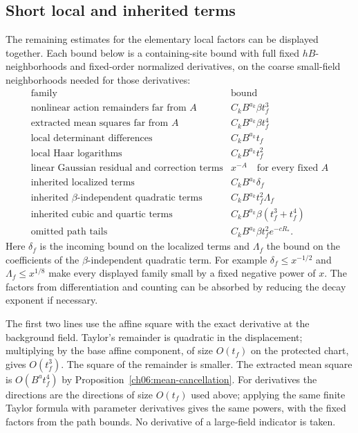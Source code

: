 \subsection{Short local and inherited terms}

The remaining estimates for the elementary local factors can be displayed together. Each bound
below is a containing-site bound with full fixed $hB$-neighborhoods and fixed-order
normalized derivatives, on the coarse small-field neighborhoods needed
for those derivatives:
\[
\begin{array}{l|l}
 \text{family}&\text{bound}\\ \hline
 \text{nonlinear action remainders far from }A
       & C_k B^{a_k}\beta t_f^3\\
 \text{extracted mean squares far from }A
       & C_k B^{a_k}\beta t_f^4\\
 \text{local determinant differences}
       & C_k B^{a_k}t_f\\
 \text{local Haar logarithms}
       & C_k B^{a_k}t_f^2\\
 \text{linear Gaussian residual and correction terms}
       & x^{-A}\quad\text{for every fixed }A\\
 \text{inherited localized terms}
       & C_k B^{a_k}\delta_f\\
 \text{inherited $\beta$-independent quadratic terms}
       & C_k B^{a_k}t_f^2\Lambda_f\\
 \text{inherited cubic and quartic terms}
       & C_k B^{a_k}\beta(t_f^3+t_f^4)\\
 \text{omitted path tails}
       & C_k B^{a_k}\beta t_f^2 e^{-cR_*}.
\end{array}
\]
Here $\delta_f$ is the incoming bound on the localized terms and $\Lambda_f$
the bound on the coefficients of the $\beta$-independent quadratic term. For example
$\delta_f\le x^{-1/2}$ and $\Lambda_f\le x^{1/8}$ make every displayed
family small by a fixed negative power of $x$.
The factors from differentiation and counting can be absorbed by
reducing the decay exponent if necessary.

The first two lines use the affine square with the exact
derivative at the background field. Taylor's remainder is quadratic in the displacement;
multiplying by the base affine component, of size $O(t_f)$ on the protected
chart, gives $O(t_f^3)$. The square of the remainder is smaller.
The extracted mean square is $O(B^a t_f^4)$ by
Proposition~\ref{ch06:mean-cancellation}. For derivatives the directions
are the directions of size $O(t_f)$ used above; applying the
same finite Taylor formula with parameter derivatives gives the same
powers, with the fixed factors from the path bounds. No derivative of a large-field indicator is taken.

